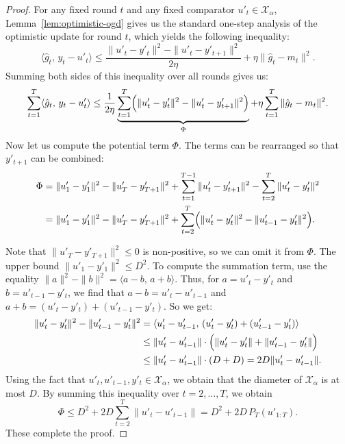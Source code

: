\documentclass[journal,onecolumn]{IEEEtran}
\newcommand{\cX}{\mathcal{X}}
\theoremstyle{plain}
\theoremstyle{definition}
\theoremstyle{remark}
\begin{document}
{\begin{proof}
    For any fixed round $t$ and any fixed comparator $u'_{t} \in \mathcal{X}_{\alpha}$,
    Lemma~\ref{lem:optimistic-ogd} gives us the standard one-step analysis of the optimistic update for round $t$, which yields the following inequality:
    \begin{equation*}
        \langle \hat g_{t},\, y_{t}-u'_{t}\rangle \le\frac{\|u'_{t}-y'_{t}\|^{2}-\|u'_{t}-y'_{t+1}\|^{2}}{2\eta}
        +\eta\|\hat g_{t}-m_{t}\|^{2}.
    \end{equation*}
    Summing both sides of this inequality over all rounds gives us:
    \begin{equation*}
        \sum_{t=1}^{T} \langle \hat g_{t},\, y_{t}-u'_{t}\rangle \le\frac{1}{2\eta}
        \underbrace{\sum_{t=1}^T\Bigl(\|u'_t-y'_t\|^2-\|u'_t-y'_{t+1}\|^2\Bigr)}
        _{\Phi}+\eta\sum_{t=1}^{T}\|\hat g_{t}-m_{t}\|^{2}.
    \end{equation*}
    Now let us compute the potential term $\Phi$. The terms can be rearranged so that $y'_{t+1}$ can be combined:
    \begin{align*}
        \Phi & =\|u'_{1}-y'_{1}\|^{2} - \|u'_{T}-y'_{T+1}\|^{2} + \sum_{t=1}^{T-1}\|u'_{t}-y'_{t+1}\|^{2} - \sum_{t=2}^{T} \|u'_{t}-y'_{t}\|^{2} \\
        & =\|u'_{1}-y'_{1}\|^{2} - \|u'_{T}-y'_{T+1}\|^{2}+ \sum_{t=2}^{T} \Bigl( \|u'_{t}-y'_{t}\|^{2} - \|u'_{t-1}-y'_{t}\|^{2} \Bigr).
    \end{align*}

    Note that $\|u'_{T}-y'_{T+1}\|^{2}\le 0$ is non-positive, so we can omit it from $\Phi$. The upper bound $\|u'_{1}-y'_{1}\|^{2}\le D^{2}$. To compute the summation term, use the equality $\|a\|^{2}-\|b\|^{2}=\langle a-b,\,a+b\rangle$. Thus, for $a=u'_{t}-y'_{t}$ and $b=u'_{t-1}-y'_{t}$, we find that $a-b=u'_{t}-u'_{t-1}$ and $a+b=(u'_{t}-y'_{t})+(u'_{t-1}-y'_{t})$. So we get:
    \begin{align*}
        \|u'_{t}-y'_{t}\|^{2}-\|u'_{t-1}-y'_{t}\|^{2} & =\langle u'_{t}-u'_{t-1},\, (u'_{t}-y'_{t})+(u'_{t-1}-y'_{t})\rangle\\
        & \le\|u'_{t}-u'_{t-1}\| \cdot \Bigl(\|u'_{t}-y'_{t}\|+\|u'_{t-1}-y'_{t}\|\Bigr) \\
        & \le\|u'_{t}-u'_{t-1}\| \cdot (D+D) =2D\|u'_{t}-u'_{t-1}\|.
    \end{align*}
    Using the fact that $u'_{t},u'_{t-1},y'_{t}\in \cX_{\alpha}$, we obtain that the diameter of $\cX_{\alpha}$ is at most $D$. By summing this inequality over $t=2,\ldots,T$, we obtain 
    \begin{equation*}
        \Phi \le D^{2} + 2D \sum_{t=2}^{T} \|u'_{t}-u'_{t-1}\| = D^{2} +
        2D\,P_{T}(u'_{1:T}).
    \end{equation*}
    These complete the proof.
\end{proof}

}
\end{document}
